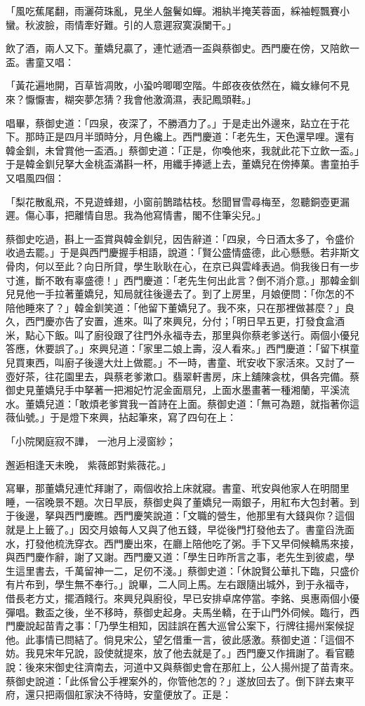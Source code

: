 \begin{showcontents}{}
「風吃蕉尾翻，雨灑荷珠亂，見坐人盤鬢如蟬。湘紈半掩芙蓉面，綵袖輕飄賽小蠻。秋波臉，雨情牽好難。引的人意遲寂寞淚闌干。」

飲了酒，兩人又下。董嬌兒贏了，連忙遞酒一盃與蔡御史。西門慶在傍，又陪飲一盃。書童又唱：

「黃花遍地開，百草皆凋敗，小蛩吟唧唧空階。牛郎夜夜依然在，織女緣何不見來？懨懨害，糊突夢怎猜？我會他激滴濕，表記鳳頭鞋。」

唱畢，蔡御史道：「四泉，夜深了，不勝酒力了。」于是走出外邊來，跕立在于花下。那時正是四月半頭時分，月色纔上。西門慶道：「老先生，天色還早哩。還有韓金釧，未曾賞他一盃酒。」蔡御史道：「正是，你喚他來，我就此花下立飲一盃。」于是韓金釧兒拏大金桃盃滿斟一杯，用纖手捧遞上去，董嬌兒在傍捧菓。書童拍手又唱風四個：

「梨花散亂飛，不見遊蜂翅，小窗前鵲踏枯枝。愁聞冒雪尋梅至，忽聽銅壺更漏遲。傷心事，把離情自思。我為他寫情書，閣不住筆尖兒。」

蔡御史吃過，斟上一盃賞與韓金釧兒，因告辭道：「四泉，今日酒太多了，令盛价收過去罷。」于是與西門慶握手相語，說道：「賢公盛情盛德，此心懸懸。若非斯文骨肉，何以至此？向日所貸，學生耿耿在心，在京已與雲峰表過。倘我後日有一步寸進，斷不敢有辜盛德！」西門慶道：「老先生何出此言？倒不消介意。」那韓金釧兒見他一手拉著董嬌兒，知局就往後邊去了。到了上房里，月娘便問：「你怎的不陪他睡來了？」韓金釧笑道：「他留下董嬌兒了。我不來，只在那裡做甚麼？」良久，西門慶亦告了安置，進來。叫了來興兒，分付；「明日早五更，打發食盒酒米，點心下飯。叫了廚役跟了往門外永福寺去，那里與你蔡老爹送行。兩個小優兒答應，休要誤了。」來興兒道：「家里二娘上壽，沒人看來。」西門慶道：「留下棋童兒買東西，叫廚子後邊大灶上做罷。」不一時，書童、玳安收下家活來。又討了一壺好茶，往花園里去，與蔡老爹漱口。翡翠軒書房，床上舖陳衾枕，俱各完備。蔡御史見董嬌兒手中拏著一把湘妃竹泥金面扇兒，上面水墨畫著一種湘蘭，平溪流水。董嬌兒道：「敢煩老爹賞我一首詩在上面。蔡御史道：「無可為題，就指著你這薇仙號。」于是燈下來興，拈起筆來，寫了四句在上：

「小院閑庭寂不譁，  一池月上浸窗紗；

邂逅相逢天未晚，  紫薇郎對紫薇花。」

寫畢，那董嬌兒連忙拜謝了，兩個收拾上床就寢。書童、玳安與他家人在明間里睡，一宿晚景不題。次日早辰，蔡御史與了董嬌兒一兩銀子，用紅布大包封著。到于後邊，拏與西門慶瞧。西門慶笑說道：「文職的營生，他那里有大錢與你？這個就是上上籤了。」因交月娘每人又與了他五錢，早從後門打發他去了。書童舀洗面水，打發他梳洗穿衣。西門慶出來，在廳上陪他吃了粥。手下又早伺候轎馬來接，與西門慶作辭，謝了又謝。西門慶又道：「學生日昨所言之事，老先生到彼處，學生這里書去，千萬留神一二，足仞不淺。」蔡御史道：「休說賢公華扎下臨，只盛价有片布到，學生無不奉行。」說畢，二人同上馬。左右跟隨出城外，到于永福寺，借長老方丈，擺酒餞行。來興兒與廚役，早已安排卓席停當。李銘、吳惠兩個小優彈唱。數盃之後，坐不移時，蔡御史起身。夫馬坐轎，在于山門外伺候。臨行，西門慶說起苗青之事：「乃學生相知，因詿誤在舊大巡曾公案下，行牌往揚州案候捉他。此事情已問結了。倘見宋公，望乞借重一言，彼此感激。蔡御史道：「這個不妨。我見宋年兄說，設使就提來，放了他去就是了。」西門慶又作揖謝了。看官聽說：後來宋御史往濟南去，河道中又與蔡御史會在那舡上，公人揚州提了苗青來。蔡御史說道：「此係曾公手裡案外的，你管他怎的？」遂放回去了。倒下詳去東平府，還只把兩個舡家決不待時，安童便放了。正是：


\end{showcontents}
